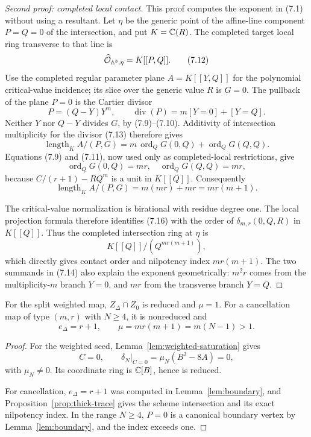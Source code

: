 \begin{proof}[Second proof: completed local contact]
This proof computes the exponent in (7.1) without using a resultant.  Let
$\eta$ be the generic point of the affine-line component $P=Q=0$ of the
intersection, and put $K=\mathbb C(R)$.  The completed target local ring transverse
to that line is
\[
 \widehat{\mathcal O}_{\mathbb A^3,\eta}=K[[P,Q]].              \tag{7.12}
\]
Use the completed regular parameter plane $A=K[[Y,Q]]$ for the polynomial
critical-value incidence; its slice over the generic value $R$ is $G=0$.
The pullback of the plane $P=0$ is the Cartier divisor
\[
 P=(Q-Y)Y^m,
 \qquad
 \operatorname{div}(P)=m[Y=0]+[Y=Q].                    \tag{7.13}
\]
Neither $Y$ nor $Q-Y$ divides $G$, by (7.9)--(7.10).  Additivity of
intersection multiplicity for the divisor (7.13) therefore gives
\[
 \operatorname{length}_K A/(P,G)
 =m\,\operatorname{ord}_QG(0,Q)
  +\operatorname{ord}_QG(Q,Q).                           \tag{7.14}
\]
Equations (7.9) and (7.11), now used only as completed-local restrictions,
give
\[
 \operatorname{ord}_QG(0,Q)=mr,
 \quad
 \operatorname{ord}_QG(Q,Q)=mr,                         \tag{7.15}
\]
because $C/(r+1)-RQ^m$ is a unit in $K[[Q]]$.  Consequently
\[
 \operatorname{length}_K A/(P,G)
 =m(mr)+mr=mr(m+1).                                      \tag{7.16}
\]

The critical-value normalization is birational with residue degree one.
The local projection formula therefore identifies (7.16) with the order of
$\delta_{m,r}(0,Q,R)$ in $K[[Q]]$.  Thus the completed intersection ring at
$\eta$ is
\[
 K[[Q]]/(Q^{mr(m+1)}),                                   \tag{7.17}
\]
which directly gives contact order and nilpotency index $mr(m+1)$.  The two
summands in (7.14) also explain the exponent geometrically: $m^2r$ comes
from the multiplicity-$m$ branch $Y=0$, and $mr$ from the transverse branch
$Y=Q$.
\end{proof}

\begin{lemma}\label{lem:contact}
For the split weighted map, $Z_\Delta\cap Z_0$ is reduced and $\mu=1$.
For a cancellation map of type $(m,r)$ with $N\ge4$, it is nonreduced and
\[
 e_\Delta=r+1,\qquad
 \mu=mr(m+1)=m(N-1)>1.                                   \tag{7.18}
\]
\end{lemma}

\begin{proof}
For the weighted seed, Lemma~\ref{lem:weighted-saturation} gives
\[
 C=0,\qquad \delta_N|_{C=0}=\mu_N(B^2-8A)=0,
\]
with $\mu_N\ne0$.  Its coordinate ring is $\mathbb C[B]$, hence is reduced.

For cancellation, $e_\Delta=r+1$ was computed in Lemma~\ref{lem:boundary},
and Proposition~\ref{prop:thick-trace} gives the scheme intersection and its
exact nilpotency index.  In the range $N\ge4$, $P=0$ is a canonical boundary
vertex by Lemma~\ref{lem:boundary}, and the index exceeds one.
\end{proof}
